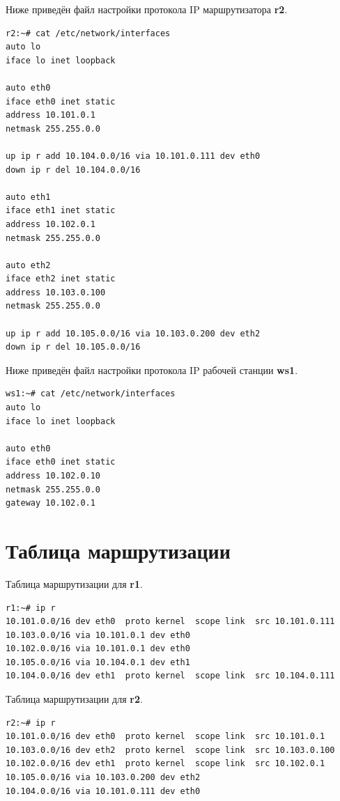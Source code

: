 \documentclass[a4paper,12pt]{article}
\begin{document}
Ниже приведён файл настройки протокола IP маршрутизатора \textbf{r2}.

\begin{Verbatim}
r2:~# cat /etc/network/interfaces 
auto lo
iface lo inet loopback

auto eth0
iface eth0 inet static
address 10.101.0.1
netmask 255.255.0.0

up ip r add 10.104.0.0/16 via 10.101.0.111 dev eth0
down ip r del 10.104.0.0/16

auto eth1
iface eth1 inet static
address 10.102.0.1
netmask 255.255.0.0

auto eth2
iface eth2 inet static
address 10.103.0.100
netmask 255.255.0.0

up ip r add 10.105.0.0/16 via 10.103.0.200 dev eth2
down ip r del 10.105.0.0/16
\end{Verbatim}

Ниже приведён файл настройки протокола IP рабочей станции \textbf{ws1}.

\begin{Verbatim}
ws1:~# cat /etc/network/interfaces 
auto lo
iface lo inet loopback

auto eth0
iface eth0 inet static
address 10.102.0.10
netmask 255.255.0.0
gateway 10.102.0.1
\end{Verbatim}


\section{Таблица маршрутизации}

Таблица маршрутизации для \textbf{r1}.

\begin{Verbatim}
r1:~# ip r
10.101.0.0/16 dev eth0  proto kernel  scope link  src 10.101.0.111 
10.103.0.0/16 via 10.101.0.1 dev eth0 
10.102.0.0/16 via 10.101.0.1 dev eth0 
10.105.0.0/16 via 10.104.0.1 dev eth1 
10.104.0.0/16 dev eth1  proto kernel  scope link  src 10.104.0.111
\end{Verbatim}

Таблица маршрутизации для \textbf{r2}.

\begin{Verbatim}
r2:~# ip r
10.101.0.0/16 dev eth0  proto kernel  scope link  src 10.101.0.1 
10.103.0.0/16 dev eth2  proto kernel  scope link  src 10.103.0.100 
10.102.0.0/16 dev eth1  proto kernel  scope link  src 10.102.0.1 
10.105.0.0/16 via 10.103.0.200 dev eth2 
10.104.0.0/16 via 10.101.0.111 dev eth0
\end{Verbatim}
\end{document}
